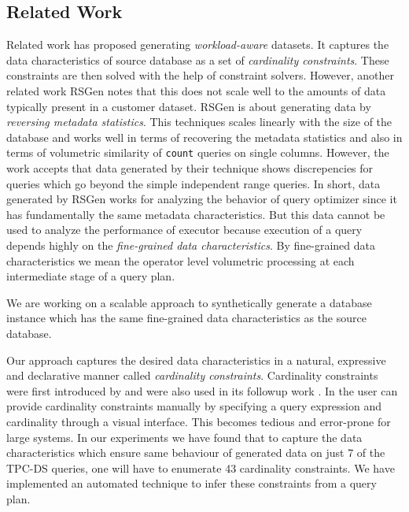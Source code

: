 \documentclass[]{article}
\begin{document}
\begin{multicols}{2}
	\section{Related Work}
		Related work \cite{arasu} has proposed generating \textit{workload-aware} datasets. 
		It captures the data characteristics of source database as a set of \textit{cardinality constraints}. 
		These constraints are then solved with the help of constraint solvers. 
		However, another related work RSGen \cite{rsgen} notes that this does not scale well to the amounts of data typically present in a customer dataset. 
		RSGen \cite{rsgen} is about generating data by \textit{reversing metadata statistics}. 
		This techniques scales linearly with the size of the database and works well in terms of recovering the metadata statistics and also in terms of volumetric similarity of \texttt{count} queries on single columns.
		However, the work accepts that data generated by their technique shows discrepencies for queries which go beyond the simple independent range queries. 
		In short, data generated by RSGen works for analyzing the behavior of query optimizer since it has fundamentally the same metadata characteristics. 
		But this data cannot be used to analyze the performance of executor because execution of a query depends highly on the \textit{fine-grained data characteristics}. 
		By fine-grained data characteristics we mean the operator level volumetric processing at each intermediate stage of a query plan. 
		
		We are working on a scalable approach to synthetically generate a database instance which has the same fine-grained data characteristics as the source database. 

		Our approach captures the desired data characteristics in a natural, expressive and declarative manner called \textit{cardinality constraints}. 
		Cardinality constraints were first introduced by \cite{arasu} and were also used in its followup work \cite{datasynth}. 
		In \cite{datasynth} the user can provide cardinality constraints manually by specifying a query expression and cardinality through a visual interface. 
		This becomes tedious and error-prone for large systems. 
		In our experiments we have found that to capture the data characteristics which ensure same behaviour of generated data on just 7 of the TPC-DS queries, one will have to enumerate 43 cardinality constraints. 
		We have implemented an automated technique to infer these constraints from a query plan. 		


\end{multicols}
\end{document}
